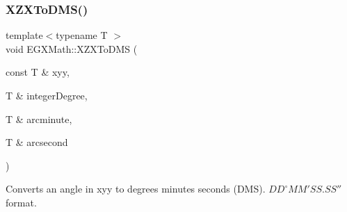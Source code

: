 \subsubsection{\texorpdfstring{X\+Z\+X\+To\+D\+M\+S()}{XZXToDMS()}}
{\footnotesize\ttfamily template$<$typename T $>$ \\
void E\+G\+X\+Math\+::\+X\+Z\+X\+To\+D\+MS (\begin{DoxyParamCaption}\item[{const T \&}]{xyy,  }\item[{T \&}]{integer\+Degree,  }\item[{T \&}]{arcminute,  }\item[{T \&}]{arcsecond }\end{DoxyParamCaption})}



Converts an angle in xyy to degrees minutes seconds (D\+MS). ${DD}^{\circ}{MM}'{SS.SS}''$ format. 


